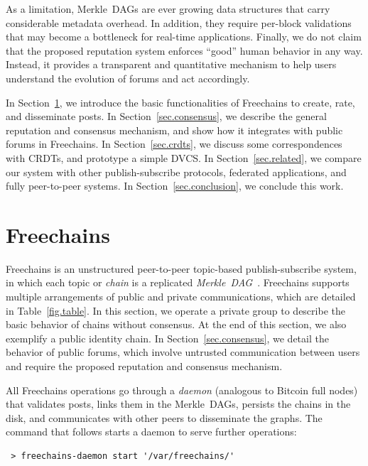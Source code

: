 \documentclass[10pt,journal,compsoc]{IEEEtran}
\newcommand{\FC}       {Freechains\xspace}
\begin{document}
As a limitation, Merkle~DAGs are ever growing data structures that carry
considerable metadata overhead.
In addition, they require per-block validations that may become a bottleneck
for real-time applications.
%
Finally, we do not claim that the proposed reputation system enforces ``good''
human behavior in any way.
Instead, it provides a transparent and quantitative mechanism to help users
understand the evolution of forums and act accordingly.

In Section~\ref{sec.freechains}, we introduce the basic functionalities of \FC
to create, rate, and disseminate posts.
In Section~\ref{sec.consensus}, we describe the general reputation and
consensus mechanism, and show how it integrates with public forums in \FC.
In Section~\ref{sec.crdts}, we discuss some correspondences with CRDTs, and
prototype a simple DVCS.
In Section~\ref{sec.related}, we compare our system with other
publish-subscribe protocols, federated applications, and fully
peer-to-peer systems.
In Section~\ref{sec.conclusion}, we conclude this work.

\section{\FC}
\label{sec.freechains}

\FC is an unstructured peer-to-peer topic-based publish-subscribe system, in
which each topic or \emph{chain} is a replicated
\emph{Merkle~DAG}~\cite{fcs.sbseg20}.
\FC supports multiple arrangements of public and private communications, which
are detailed in Table~\ref{fig.table}.
In this section, we operate a private group to describe the basic behavior of
chains without consensus.
At the end of this section, we also exemplify a public identity chain.
In Section~\ref{sec.consensus}, we detail the behavior of public forums, which
involve untrusted communication between users and require the proposed
reputation and consensus mechanism.

All \FC operations go through a \emph{daemon} (analogous to Bitcoin full nodes)
that validates posts, links them in the Merkle~DAGs, persists the chains in
the disk, and communicates with other peers to disseminate the graphs.
The command that follows starts a daemon to serve further operations:

{\footnotesize
\begin{verbatim}
 > freechains-daemon start '/var/freechains/'
\end{verbatim}
}
\end{document}
